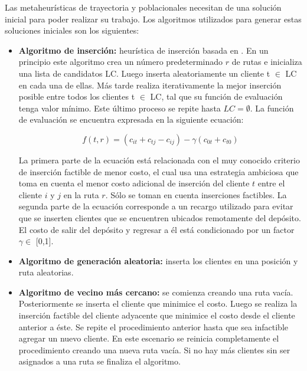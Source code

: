 Las metaheurísticas de trayectoria y poblacionales necesitan de una solución inicial para poder realizar su trabajo. Los algoritmos utilizados para generar estas soluciones iniciales son los siguientes:

\begin{itemize}
\item \textbf{Algoritmo de inserción:} heurística de inserción basada en \cite{heuristicainsercion}. En un principio este algoritmo  crea un número predeterminado $r$ de rutas e inicializa una lista de candidatos LC. Luego inserta aleatoriamente un cliente t $\in $ LC en cada una de ellas. Más tarde realiza iterativamente la mejor inserción posible entre todos los clientes t $\in$ LC, tal que su función de evaluación tenga valor mínimo. Este último proceso se repite hasta $LC = \emptyset$. La función de evaluación se encuentra expresada en la siguiente ecuación:

\begin{equation}\label{eq:insercion}
f(t,r)= (c_{it}+c_{tj}-c_{ij}) - \gamma (c_{0t}+c_{t0})
\end{equation}

La primera parte de la ecuación está relacionada con el muy conocido criterio de inserción factible de menor costo, el cual  usa una estrategia ambiciosa que toma en cuenta el menor costo adicional de inserción del cliente $t$ entre el cliente $i$ y $j$ en la ruta $r$. Sólo se toman en cuenta inserciones factibles.   La segunda parte de la ecuación corresponde a un recargo utilizado para evitar que se inserten clientes que se encuentren ubicados remotamente del depósito. El costo de salir del depósito y regresar a él está condicionado por un factor $\gamma \in$ [0,1].


\item \textbf{Algoritmo de generación aleatoria:} inserta los clientes en una posición y ruta aleatorias. 

\item \textbf{Algoritmo de vecino más cercano:} se comienza creando una ruta vacía. Posteriormente se inserta el cliente que minimice el costo.  Luego se realiza la inserción factible del cliente adyacente que minimice el costo desde el cliente anterior a éste. Se repite el procedimiento anterior hasta que sea infactible agregar un nuevo cliente. En este escenario se reinicia completamente el procedimiento creando una nueva ruta vacía. Si no hay más clientes sin ser asignados a una ruta se finaliza el algoritmo.


\end{itemize}
